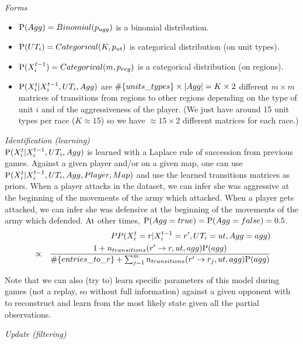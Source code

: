 \vspace{0.3cm}
\textit{Forms}\\

\begin{itemize}
    \item $\mathrm{P}(Agg)=Binomial(p_{agg})$ is a binomial distribution.
    \item $\mathrm{P}(UT_i)=Categorical(K,p_{ut})$ is categorical distribution (on unit types).
    \item $\mathrm{P}(X^{t-1}_{i})=Categorical(m, p_{reg})$ is a categorical distribution (on regions).
    \item $\mathrm{P}(X^t_i|X^{t-1}_i,UT_i,Agg)$ are $\#\{units\_types\} \times \left\lvert Agg\right\rvert = K \times 2$ different $m\times m$ matrices of transitions from regions to other regions depending on the type of unit $i$ and of the aggressiveness of the player. (We just have around 15 unit types per race ($K \approx 15$) so we have $\approx 15\times 2$ different matrices for each race.)
\end{itemize}


\vspace{0.3cm}
\textit{Identification (learning)}\\

$\mathrm{P}(X^t_i|X^{t-1}_i, UT_i, Agg)$ is learned with a Laplace rule of succession from previous games. Against a given player and/or on a given map, one can use $\mathrm{P}(X^t_i|X^{t-1}_i, UT_i, Agg, Player, Map)$ and use the learned transitions matrices as priors. When a player attacks in the dataset, we can infer she was aggressive at the beginning of the movements of the army which attacked. When a player gets attacked, we can infer she was defensive at the beginning of the movements of the army which defended. At other times, $\mathrm{P}(Agg=true) = \mathrm{P}(Agg=false) = 0.5$.
\begin{eqnarray*}
& & PP(X^t_i=r|X^{t-1}_i=r', UT_i=ut, Agg=agg) \\
& \propto & \frac{1+n_{transitions}(r'\rightarrow r, ut, agg)\mathrm{P}(agg)}{\#\{entries\_to\_r\} + \sum_{j=1}^{m} n_{transitions}(r' \rightarrow r_j, ut, agg)\mathrm{P}(agg)}
\end{eqnarray*}

Note that we can also (try to) learn specific parameters of this model during games (not a replay, so without full information) against a given opponent with  to reconstruct and learn from the most likely state given all the partial observations.

\vspace{0.3cm}
\textit{Update (filtering)}\\

